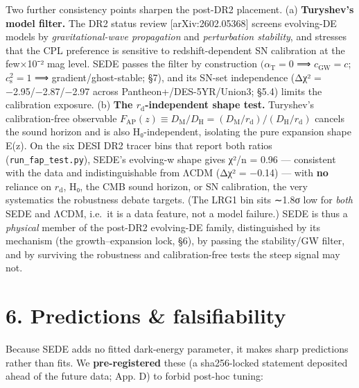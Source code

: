 \documentclass[
  10pt,
]{article}
\begin{document}
Two further consistency points sharpen the post-DR2 placement. (a)
\textbf{Turyshev's model filter.} The DR2 status review
{[}arXiv:2602.05368{]} screens evolving-DE models by
\emph{gravitational-wave propagation} and \emph{perturbation stability},
and stresses that the CPL preference is sensitive to redshift-dependent
SN calibration at the few×10⁻² mag level. SEDE passes the filter by
construction \((\alpha _{\mathrm{T}} = 0\) ⟹ \(c_{\mathrm{GW}} = c\);
\(c_{\mathrm{s}}^{2} = 1\) ⟹ gradient/ghost-stable; §7), and its SN-set
independence (Δχ² = −2.95/−2.87/−2.97 across Pantheon+/DES-5YR/Union3;
§5.4) limits the calibration exposure. (b) \textbf{The
\(r_{\mathrm{d}}\)-independent shape test.} Turyshev's calibration-free
observable
\(F_{\mathrm{AP}}(z) \equiv  D_{\mathrm{M}}/D_{\mathrm{H}} = (D_{\mathrm{M}}/r_{\mathrm{d}})/(D_{\mathrm{H}}/r_{\mathrm{d}})\)
cancels the sound horizon and is also H₀-independent, isolating the pure
expansion shape E(z). On the six DESI DR2 tracer bins that report both
ratios (\texttt{run\_fap\_test.py}), SEDE's evolving-w shape gives χ²/n
= 0.96 --- consistent with the data and indistinguishable from ΛCDM (Δχ²
= −0.14) --- with \textbf{no} reliance on \(r_{\mathrm{d}}\), H₀, the
CMB sound horizon, or SN calibration, the very systematics the
robustness debate targets. (The LRG1 bin sits ∼1.8σ low for \emph{both}
SEDE and ΛCDM, i.e.~it is a data feature, not a model failure.) SEDE is
thus a \emph{physical} member of the post-DR2 evolving-DE family,
distinguished by its mechanism (the growth--expansion lock, §6), by
passing the stability/GW filter, and by surviving the robustness and
calibration-free tests the steep signal may not.

\section{6. Predictions \&
falsifiability}\label{predictions-falsifiability}

Because SEDE adds no fitted dark-energy parameter, it makes sharp
predictions rather than fits. We \textbf{pre-registered} these (a
sha256-locked statement deposited ahead of the future data; App. D) to
forbid post-hoc tuning:
\end{document}

